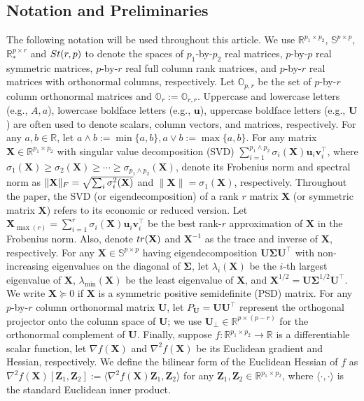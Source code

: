 \documentclass[11pt]{article}
\newcommand{\bbR}{\mathbb{R}}
\newcommand{\bbS}{\mathbb{S}}
\newcommand{\0}{{\mathbf{0}}}
\newcommand{\1}{{\mathbf{1}}}
\renewcommand{\u}{{\mathbf{u}}}
\renewcommand{\v}{{\mathbf{v}}}
\newcommand{\X}{{\mathbf{X}}}
\newcommand{\U}{{\mathbf{U}}}
\newcommand{\Z}{{\mathbf{Z}}}
\newcommand{\bSigma}{\boldsymbol{\Sigma}}
\newcommand{\tr}{{\rm tr}}
\newcommand{\F}{{\rm F}}
\newcommand{\st}{{\rm St}}
\newcommand{\bbO}{\mathbb{O}}
\begin{document}
\subsection{Notation and Preliminaries} \label{sec: notation}

The following notation will be used throughout this article. We use $\bbR^{p_1 \times p_2}$, $\bbS^{p \times p}$, $\bbR^{p \times r}_*$ and $\st(r,p)$ to denote the spaces of $p_1$-by-$p_2$ real matrices, $p$-by-$p$ real symmetric matrices, $p$-by-$r$ real full column rank matrices, and $p$-by-$r$ real matrices with orthonormal columns, respectively. Let $\bbO_{p,r}$ be the set of $p$-by-$r$ column orthonormal matrices and $\bbO_r := \bbO_{r,r}$. Uppercase and lowercase letters (e.g., $A, a$), lowercase boldface letters (e.g., $\u$), uppercase boldface letters (e.g., $\U$) are often used to denote scalars, column vectors, and matrices, respectively. For any $a, b \in \bbR$, let $a \wedge b := \min\{a,b\}, a \vee b := \max\{a,b\}$. For any matrix $\X \in \mathbb{R}^{p_1\times p_2}$ with singular value decomposition (SVD) $\sum_{i=1}^{p_1 \land p_2} \sigma_i(\X)\u_i \v_i^\top$, where $\sigma_1(\X) \geq \sigma_2(\X) \geq \cdots \geq \sigma_{p_1 \wedge p_2} (\X)$, denote its Frobenius norm and spectral norm as $\|\X\|_\F = \sqrt{\sum_{i} \sigma^2_i(\X)}$ and $\|\X\| = \sigma_1(\X)$, respectively. Throughout the paper, the SVD (or eigendecomposition) of a rank $r$ matrix $\X$ (or symmetric matrix $\X$) refers to its economic or reduced version. Let $\X_{\max(r)}= \sum_{i=1}^{r} \sigma_i(\X)\u_i \v_i^\top$ be the best rank-$r$ approximation of $\X$ in the Frobenius norm. Also, denote $\tr(\X)$ and $\X^{-1}$ as the trace and inverse of $\X$, respectively. For any $\X \in \bbS^{p \times p}$ having eigendecomposition $\U \bSigma \U^\top$ with non-increasing eigenvalues on the diagonal of $\bSigma$, let $\lambda_i(\X)$ be the $i$-th largest eigenvalue of $\X$, $\lambda_{\min}(\X)$ be the least eigenvalue of $\X$, and $\X^{1/2} = \U \bSigma^{1/2} \U^\top$. We write $\X \succcurlyeq 0$ if $\X$ is a symmetric positive semidefinite (PSD) matrix. For any $p$-by-$r$ column orthonormal matrix $\U$, let $P_{\U} = \U\U^\top$ represent the orthogonal projector onto the column space of $\U$; we use $\U_\perp\in \bbR^{p \times (p-r)}$ for the orthonormal complement of $\U$. Finally, suppose $f: \bbR^{p_1 \times p_2} \to \bbR$ is a differentiable scalar function, let $\nabla f(\X)$ and $\nabla^2 f(\X)$ be its Euclidean gradient and Hessian, respectively. We define the bilinear form of the Euclidean Hessian of $f$ as $\nabla^2 f(\X)[\Z_1, \Z_2]:= \langle \nabla^2 f(\X)\Z_1, \Z_2 \rangle $ for any $\Z_1, \Z_2 \in \bbR^{p_1 \times p_2}$, where $\langle \cdot, \cdot \rangle$ is the standard Euclidean inner product.
\end{document}
